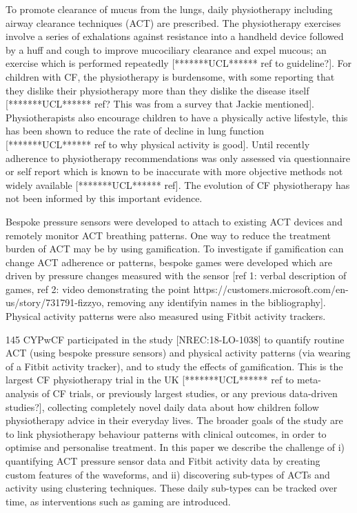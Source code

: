 \documentclass{article}
\begin{document}
To promote clearance of mucus from the lungs, daily physiotherapy including airway clearance techniques (ACT) are prescribed. The physiotherapy exercises involve a series of  exhalations against resistance into a handheld device  followed by a huff and cough to improve mucociliary clearance and expel mucous; an exercise which is performed repeatedly \cite{Villanuevaj4574} [*******UCL****** ref to guideline?]. For children with CF, the physiotherapy is burdensome, with some reporting that they dislike their physiotherapy more than they dislike the disease itself [*******UCL****** ref? This was from a survey that Jackie mentioned]. Physiotherapists also encourage children to have a physically active lifestyle, this has been shown to reduce the rate of decline in lung function [*******UCL****** ref to why physical activity is good]. Until recently adherence to physiotherapy recommendations was only assessed via questionnaire or self report which is known to be inaccurate with more objective methods not widely available [*******UCL****** ref]. The evolution of CF physiotherapy has not been informed by this important evidence.  

Bespoke pressure sensors were developed to attach to existing ACT devices and remotely monitor ACT breathing patterns. One way to reduce the treatment burden of ACT may be by using gamification. To investigate if gamification can change ACT adherence or patterns, bespoke games were developed which are driven by pressure changes measured with the sensor [ref 1: verbal description of games, ref 2: video demonstrating the point https://customers.microsoft.com/en-us/story/731791-fizzyo, removing any identifyin names in the bibliography]. Physical activity patterns were also measured using Fitbit activity trackers. 

 145 CYPwCF participated in the study [NREC:18-LO-1038] to quantify routine ACT (using bespoke pressure sensors) and physical activity patterns (via wearing of a Fitbit activity tracker), and to study the effects of gamification. This is the largest CF physiotherapy trial in the UK [*******UCL****** ref to meta-analysis of CF trials, or previously largest studies, or any previous data-driven studies?], collecting completely novel daily data about how children follow physiotherapy advice in their everyday lives. The broader goals of the study are to link physiotherapy behaviour patterns with clinical outcomes, in order to optimise and personalise treatment. In this paper we describe the challenge of i) quantifying ACT pressure sensor data and Fitbit activity data by creating custom features of the waveforms, and ii) discovering sub-types of ACTs and activity using clustering techniques. These daily sub-types can be tracked over time, as interventions such as gaming are introduced.   
\end{document}
